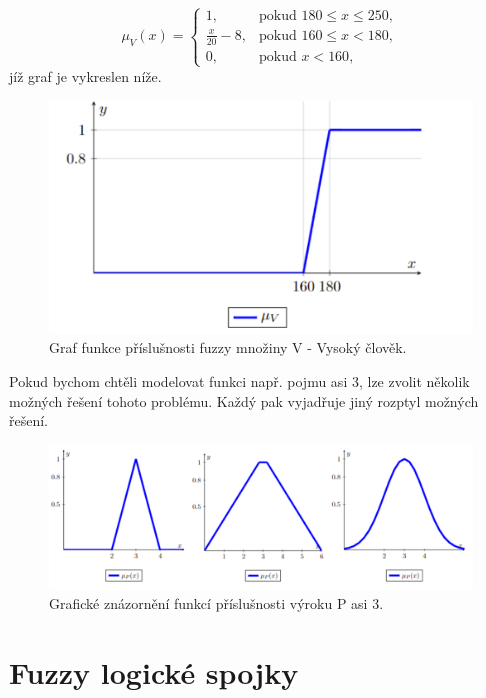     $$\mu_V(x)=\begin{cases} 1, & \mbox{pokud }  180\leq x \leq 250,\\ 
    \frac{x}{20} - 8, & \mbox{pokud } 160 \leq x < 180,\\
    0, & \mbox{pokud } x < 160,  \end{cases}$$
    jíž graf je vykreslen níže.

\begin{figure}[h]
    \caption{ Graf funkce příslušnosti fuzzy množiny V - \clqq Vysoký člověk\crqq.}
        \includegraphics[scale=0.65]{template-fig/vysoky_clovek.pdf}
        \centering
\end{figure}    



Pokud bychom chtěli modelovat funkci např. pojmu \clqq asi 3\crqq, lze zvolit několik možných řešení tohoto problému. Každý pak vyjadřuje jiný rozptyl možných řešení.
 
    \begin{figure}[h]
    \caption{Grafické znázornění funkcí příslušnosti výroku P \clqq asi 3\crqq.\\}
        \includegraphics[scale=0.65]{template-fig/asi_3.pdf}
        \centering
    \end{figure}




\section{Fuzzy logick\'e spojky}

